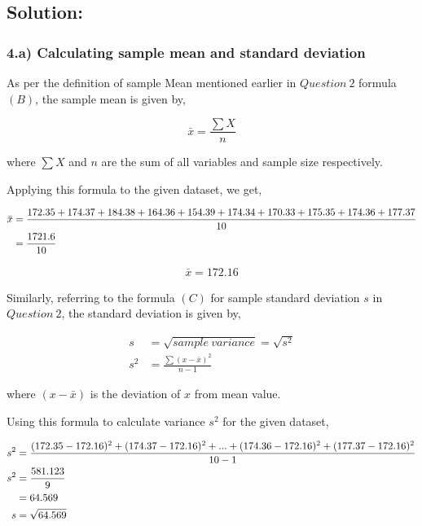 \documentclass[a4paper]{report}
\begin{document}
\subsection*{Solution:}

\subsubsection*{4.a) Calculating sample mean and standard deviation}

As per the definition of sample Mean mentioned earlier in $Question\ 2$ formula $(B)$,  the sample mean is given by,

\begin{equation*}
    \bar{x} =\frac{\sum X}{n}
\end{equation*}

where $\sum X$ and $n$ are the sum of all variables and sample size respectively.

Applying this formula to the given dataset, we get,

\begin{align}
    \notag \bar{x} &= \frac{172.35 + 174.37 + 184.38 + 164.36 + 154.39 + 174.34 + 170.33 + 175.35 + 174.36 + 177.37}{10} \\
    \notag  &=\frac{1721.6}{10}
\end{align}

\begin{align}
    \boxed{\bar{x} =172.16}
\end{align}

Similarly, referring to the formula $(C)$ for sample standard deviation $s$ in $Question\ 2$, the standard deviation is given by,

\begin{align*}
    s&=\sqrt{sample\ variance}=\sqrt{s ^2} \\
    s ^2 &= \frac{\sum (x-\bar{x})^2}{n-1}
\end{align*}

where $(x-\bar{x})$ is the deviation of $x$ from mean value.

Using this formula to calculate variance $s ^2$ for the given dataset,

\begin{align}
    \notag s ^2&=\frac{(172.35-172.16)^2+(174.37-172.16)^2+...+(174.36-172.16)^2+(177.37-172.16)^2}{10-1} \\
    \notag s ^2&= \frac{581.123}{9} \\
    \notag &=64.569 \\
    \notag s &= \sqrt{64.569} 
\end{align}
\end{document}
